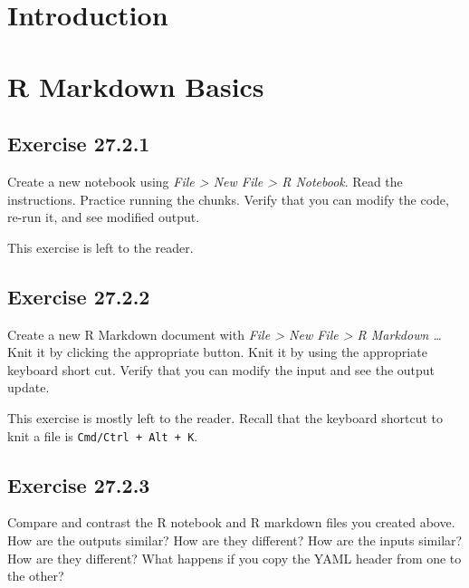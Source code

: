 \documentclass[]{book}
\theoremstyle{plain}
\theoremstyle{remark}
\theoremstyle{definition}
\theoremstyle{definition}
\theoremstyle{definition}
\theoremstyle{remark}
\begin{document}
\hypertarget{introduction-17}{%
\section{Introduction}\label{introduction-17}}

\hypertarget{r-markdown-basics}{%
\section{R Markdown Basics}\label{r-markdown-basics}}

\hypertarget{exercise-27.2.1}{%
\subsection*{\texorpdfstring{Exercise
{27.2.1}}{Exercise 27.2.1}}\label{exercise-27.2.1}}

Create a new notebook using \emph{File \textgreater{} New File
\textgreater{} R Notebook}. Read the instructions. Practice running the
chunks. Verify that you can modify the code, re-run it, and see modified
output.

This exercise is left to the reader.

\hypertarget{exercise-27.2.2}{%
\subsection*{\texorpdfstring{Exercise
{27.2.2}}{Exercise 27.2.2}}\label{exercise-27.2.2}}

Create a new R Markdown document with \emph{File \textgreater{} New File
\textgreater{} R Markdown \ldots{}} Knit it by clicking the appropriate
button. Knit it by using the appropriate keyboard short cut. Verify that
you can modify the input and see the output update.

This exercise is mostly left to the reader. Recall that the keyboard
shortcut to knit a file is \texttt{Cmd/Ctrl\ +\ Alt\ +\ K}.

\hypertarget{exercise-27.2.3}{%
\subsection*{\texorpdfstring{Exercise
{27.2.3}}{Exercise 27.2.3}}\label{exercise-27.2.3}}

Compare and contrast the R notebook and R markdown files you created
above. How are the outputs similar? How are they different? How are the
inputs similar? How are they different? What happens if you copy the
YAML header from one to the other?
\end{document}
